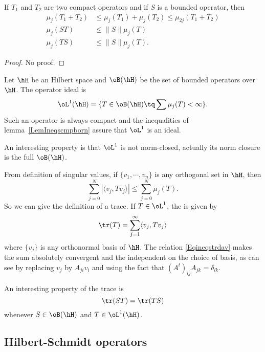 \begin{lemma}	\label{LemIneqscmpborn}
If $T_1$ and $T_2$ are two compact operators and if $S$ is a bounded operator, then
\begin{align*}
\mu_j(T_1+T_2)&\leq \mu_j(T_1)+\mu_j(T_2)\leq\mu_{2j}(T_1+T_2)\\
\mu_j(ST)&\leq\| S \|\mu_j(T)\\
\mu_j(TS)&\leq\| S \|\mu_j(T).
\end{align*}

\end{lemma}
\begin{proof}
No proof.
\end{proof}

Let $\hH$ be an Hilbert space and $\oB(\hH)$ be the set of bounded operators over $\hH$. The  operator ideal is
\begin{equation}
	\oL^1(\hH)=\{ T\in\oB(\hH)\tq \sum\mu_j(T)<\infty \}.
\end{equation}
Such an operator is always compact and the inequalities of lemma~\ref{LemIneqscmpborn} assure that $\oL^1$ is an ideal.

An interesting property is that $\oL^1$ is not norm-closed, actually its norm closure is the full $\oB(\hH)$.

From definition of singular values, if $\{ v_1,\cdots,v_n \}$ is any orthogonal set in $\hH$, then
\begin{equation}	\label{Eqineqstrdav}
  \sum_{j=0}^N| \langle v_j, Tv_j\rangle  |\leq \sum_{j=0}^{N}\mu_j(T).
\end{equation}
So we can give the definition of a trace. If $T\in\oL^1$, the  is given by
\begin{equation}
\tr(T)=\sum_{j=1}^{\infty}\langle v_j, Tv_j\rangle
\end{equation}
where $\{ v_j \}$ is any orthonormal basis of $\hH$. The relation \eqref{Eqineqstrdav} makes the sum absolutely convergent and the independent on the choice of basis, as can see by replacing $v_j$ by $A_{ji}v_i$ and using the fact that $(A^t)_{lj}A_{jk}=\delta_{lk}$.

An interesting property of the trace is
\begin{equation}
\tr(ST)=\tr(TS)
\end{equation}
whenever $S\in\oB(\hH)$ and $T\in\oL^1(\hH)$.

\subsection{Hilbert-Schmidt operators}

